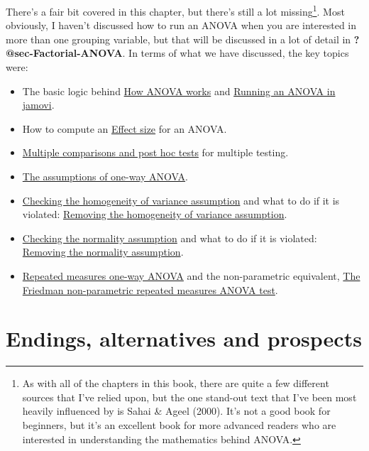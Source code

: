 \documentclass[
  a4paper,
]{book}
\providecommand{\tightlist}{%
  \setlength{\itemsep}{0pt}\setlength{\parskip}{0pt}}\usepackage{longtable,booktabs,array}
\begin{document}
There's a fair bit covered in this chapter, but there's still a lot
missing\footnote{As with all of the chapters in this book, there are
  quite a few different sources that I've relied upon, but the one
  stand-out text that I've been most heavily influenced by is Sahai \&
  Ageel (2000). It's not a good book for beginners, but it's an
  excellent book for more advanced readers who are interested in
  understanding the mathematics behind ANOVA.}. Most obviously, I
haven't discussed how to run an ANOVA when you are interested in more
than one grouping variable, but that will be discussed in a lot of
detail in \textbf{?@sec-Factorial-ANOVA}. In terms of what we have
discussed, the key topics were:

\begin{itemize}
\tightlist
\item
  The basic logic behind \protect\hyperlink{sec-How-ANOVA-works}{How
  ANOVA works} and
  \protect\hyperlink{running-an-anova-in-jamovi}{Running an ANOVA in
  jamovi}.
\item
  How to compute an \protect\hyperlink{effect-size}{Effect size} for an
  ANOVA.
\item
  \protect\hyperlink{multiple-comparisons-and-post-hoc-tests}{Multiple
  comparisons and post hoc tests} for multiple testing.
\item
  \protect\hyperlink{the-assumptions-of-one-way-anova}{The assumptions
  of one-way ANOVA}.
\item
  \protect\hyperlink{sec-Checking-the-homogeneity-of-variance-assumption}{Checking
  the homogeneity of variance assumption} and what to do if it is
  violated:
  \protect\hyperlink{removing-the-homogeneity-of-variance-assumption}{Removing
  the homogeneity of variance assumption}.
\item
  \protect\hyperlink{sec-Checking-the-normality-assumption}{Checking the
  normality assumption} and what to do if it is violated:
  \protect\hyperlink{removing-the-normality-assumption}{Removing the
  normality assumption}.
\item
  \protect\hyperlink{repeated-measures-one-way-anova}{Repeated measures
  one-way ANOVA} and the non-parametric equivalent,
  \protect\hyperlink{the-friedman-non-parametric-repeated-measures-anova-test}{The
  Friedman non-parametric repeated measures ANOVA test}.
\end{itemize}

\part{Endings, alternatives and prospects}
\end{document}
